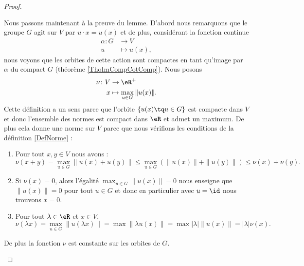 \begin{proof}
\begin{subproof}
        Nous passons maintenant à la preuve du lemme. D'abord nous remarquons que le groupe \( G\) agit sur \( V\) par \( u\cdot x=u(x)\) et de plus, considérant la fonction continue
        \begin{equation}
            \begin{aligned}
                \alpha\colon G&\to V \\
                u&\mapsto u(x), 
            \end{aligned}
        \end{equation}
        nous voyons que les orbites de cette action sont compactes en tant qu'image par \( \alpha\) du compact \( G\) (théorème \ref{ThoImCompCotComp}). Nous posons
        \begin{equation}
            \begin{aligned}
                \nu\colon V&\to \eR^+ \\
                x&\mapsto \max_{u\in G}\| u(x) \|. 
            \end{aligned}
        \end{equation}
        Cette définition a un sens parce que l'orbite \( \{ u(x)\tq u\in G \}\) est compacte dans \( V\) et donc l'ensemble des normes est compact dans \( \eR\) et admet un maximum. De plus cela donne une norme sur \( V\) parce que nous vérifions les conditions de la définition \ref{DefNorme} :
        \begin{enumerate}
            \item
                Pour tout \( x,y\in V\) nous avons :
                \begin{equation}
                    \nu(x+y)=\max_{u\in G}\| u(x)+u(y) \|\leq \max_{u\in G}\left( \| u(x) \|+\| u(y) \| \right)\leq \nu(x)+\nu(y).
                \end{equation}
            \item
                Si \( \nu(x)=0\), alors l'égalité \( \max_{u\in G}\| u(x) \|=0\) nous enseigne que \( \| u(x) \|=0\) pour tout \( u\in G\) et donc en particulier avec \( u=\id\) nous trouvons \( x=0\).
            \item
                Pour tout \( \lambda\in \eR\) et \( x\in V\),
                \begin{equation}
                    \nu(\lambda x)=\max_{u\in G}\| u(\lambda x) \|=\max\| \lambda u(x) \|=\max| \lambda |\| u(x) \|=| \lambda |\nu(x).
                \end{equation}
        \end{enumerate}
        De plus la fonction \( \nu\) est constante sur les orbites de \( G\).


\end{subproof}
\end{proof}
